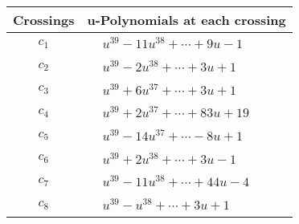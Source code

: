 \documentclass[1p]{elsarticle_modified}
\theoremstyle{definition}
\begin{document}
\begin{tabular}{m{50pt}|m{274pt}}
Crossings & \hspace{64pt}u-Polynomials at each crossing \\
\hline $$\begin{aligned}c_{1}\end{aligned}$$&$\begin{aligned}
&u^{39}-11 u^{38}+\cdots+9 u-1
\end{aligned}$\\
\hline $$\begin{aligned}c_{2}\end{aligned}$$&$\begin{aligned}
&u^{39}-2 u^{38}+\cdots+3 u+1
\end{aligned}$\\
\hline $$\begin{aligned}c_{3}\end{aligned}$$&$\begin{aligned}
&u^{39}+6 u^{37}+\cdots+3 u+1
\end{aligned}$\\
\hline $$\begin{aligned}c_{4}\end{aligned}$$&$\begin{aligned}
&u^{39}+2 u^{37}+\cdots+83 u+19
\end{aligned}$\\
\hline $$\begin{aligned}c_{5}\end{aligned}$$&$\begin{aligned}
&u^{39}-14 u^{37}+\cdots-8 u+1
\end{aligned}$\\
\hline $$\begin{aligned}c_{6}\end{aligned}$$&$\begin{aligned}
&u^{39}+2 u^{38}+\cdots+3 u-1
\end{aligned}$\\
\hline $$\begin{aligned}c_{7}\end{aligned}$$&$\begin{aligned}
&u^{39}-11 u^{38}+\cdots+44 u-4
\end{aligned}$\\
\hline $$\begin{aligned}c_{8}\end{aligned}$$&$\begin{aligned}
&u^{39}- u^{38}+\cdots+3 u+1
\end{aligned}$\\

\end{tabular}
\end{document}
